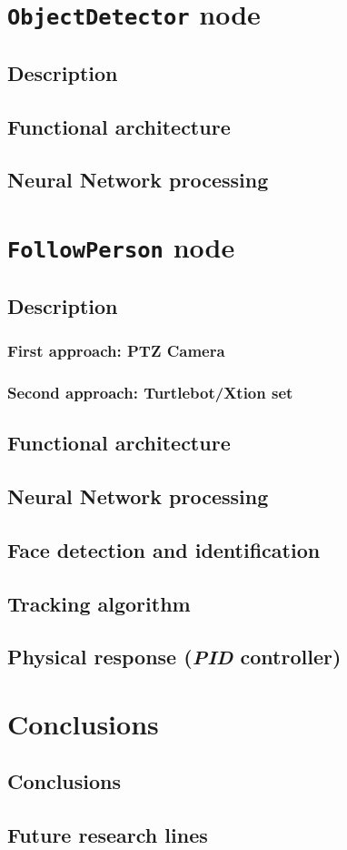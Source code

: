 \chapter{\texttt{ObjectDetector} node}
\section{Description}
\section{Functional architecture}
\section{Neural Network processing}


\chapter{\texttt{FollowPerson} node}
\label{chap:followperson}
\section{Description}
	\subsection{First approach: PTZ Camera}
	\label{sec:follow_ptz}
	\subsection{Second approach: Turtlebot/Xtion set}
	\label{sec:follow_turtlebot}
\section{Functional architecture}
\section{Neural Network processing}
\section{Face detection and identification}
\section{Tracking algorithm}
\section{Physical response (\emph{PID} controller)}



\chapter{Conclusions}
	\section{Conclusions}
	\section{Future research lines}